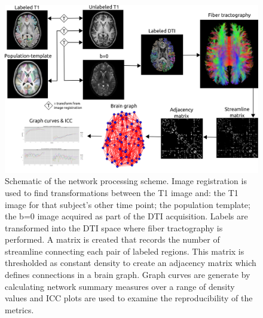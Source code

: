 \documentclass{frontiersSCNS} %
\begin{document}
\begin{figure}
\begin{center}
\includegraphics[width=\linewidth]{figures/flow.png} 
\caption{Schematic of the network processing scheme. Image registration is used to find transformations between the T1 image and: the T1 image for that subject's other time point; the population template; the b=0 image acquired as part of the DTI acquisition. Labels are transformed into the DTI space where fiber tractography is performed. A matrix is created that records the number of streamline connecting each pair of labeled regions. This matrix is thresholded as constant density to create an adjacency matrix which defines connections in a brain graph. Graph curves are generate by calculating network summary measures over a range of density values and ICC plots are used to examine the reproducibility of the metrics.}
\label{fig:scheme}
\end{center}
\end{figure}
\end{document}

